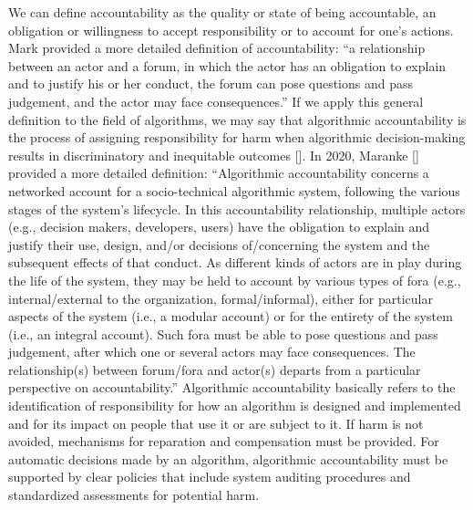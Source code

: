 We can define accountability as the quality or state of being accountable, an obligation or willingness to accept responsibility or to account for one's actions. Mark \citet{chap:10:Bovens:2007} provided a more detailed definition of accountability: ``a relationship between an actor and a forum, in which the actor has an obligation to explain and to justify his or her conduct, the forum can pose questions and pass judgement, and the actor may face consequences.'' If we apply this general definition to the field of algorithms, we may say that algorithmic accountability is the process of assigning responsibility for harm when algorithmic decision-making results in discriminatory and inequitable outcomes [\citealt{chap:10:Caplanetal:2018}]. In 2020, Maranke \citeauthor{chap:10:Wieringa:2020} [\citeyear{chap:10:Wieringa:2020}] provided a more detailed definition: \hbox{``Algorithmic} accountability concerns a networked account for a socio-technical algorithmic \hbox{system,} following the various stages of the system's lifecycle. In this accountability relationship, multiple actors (e.g., decision makers, developers,\vadjust{\vfill\pagebreak} users) have the obligation to explain and justify their use, design, and/or decisions of/concerning the system and the subsequent effects of that conduct. As different kinds of actors are in play during the life of the system, they may be held to account by various types of fora (e.g., internal/external to the organization, formal/informal), either for particular aspects of the system (i.e., a modular account) or for the entirety of the system (i.e., an integral account). Such fora must be able to pose questions and pass judgement, after which one or several actors may face consequences. The relationship(s) between forum/fora and actor(s) departs from a particular perspective on accountability.'' Algorithmic accountability basically refers to the identification of responsibility for how an algorithm is designed and implemented and for its impact on people that use it or are subject to it. If harm is not avoided, mechanisms for reparation and compensation must be provided. For automatic decisions made by an algorithm, algorithmic accountability must be supported by clear policies that include system auditing procedures and standardized assessments for potential harm.

